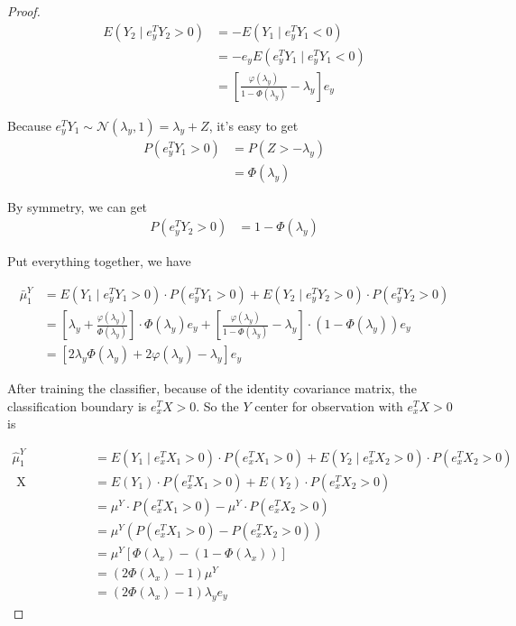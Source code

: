 \documentclass[11pt]{article}
\begin{document}
\begin{proof}
\begin{align}
E(Y_2 \mid e^T_y Y_2 > 0)  &= - E(Y_1 \mid e^T_y Y_1 < 0) \\
	&= - e_y E( e^T_y Y_1 \mid e^T_y Y_1 < 0  )  \\
	&= \left[ \frac{\varphi(\lambda_y)}{1-\Phi(\lambda_y)} - \lambda_y  \right] e_y 
\end{align}

Because $e^T_y Y_1 \sim \mathcal{N}\left( \lambda_y, 1\right)  = \lambda_y + Z$, it's easy to get 
\begin{align}
P(e^T_y Y_1 > 0) &= P(Z > - \lambda_y) \\
	&= \Phi(\lambda_y) 
\end{align}

By symmetry, we can get 
\begin{align}
P(e^T_y Y_2 > 0) &= 1- \Phi(\lambda_y)
\end{align}

Put everything together, we have 

\begin{align}
\bar{\mu}^Y_1 & = E(Y_1 \mid e^T_y Y_1 > 0) \cdot P(e^T_y Y_1 >0) +E(Y_2 \mid e^T_y Y_2 > 0) \cdot P(e^T_y Y_2 >0) \\
 &=  \left[ \lambda_y + \frac{\varphi(\lambda_y)}{\Phi(\lambda_y)}  \right]\cdot \Phi(\lambda_y) e_y + \left[ \frac{\varphi(\lambda_y)}{1-\Phi(\lambda_y)} - \lambda_y  \right]\cdot\left(1- \Phi(\lambda_y)\right) e_y  \\
 & = [2\lambda_y \Phi(\lambda_y) + 2\varphi(\lambda_y) - \lambda_y]e_y 
\end{align}

After training the classifier, because of the identity covariance matrix, the classification boundary is $e^T_x X > 0$. So the $Y$ center for observation with $e^T_x X > 0$ is 

\begin{align}
\hat{\mu}^Y_1 &= E(Y_1 \mid e^T_x X_1 > 0)\cdot P(e^T_x X_1 > 0) + E(Y_2 \mid e^T_x X_2 > 0)\cdot P(e^T_x X_2 > 0)\\ 
\text{ X independent of Y}	&= E(Y_1) \cdot P(e^T_x X_1 > 0) + E(Y_2) \cdot P(e^T_x X_2 > 0)\\ 
  & = \mu^Y \cdot P(e^T_x X_1 > 0) -  \mu^Y \cdot P(e^T_x X_2 > 0)\\
  & = \mu^Y \left( P(e^T_x X_1 > 0) -  P(e^T_x X_2 > 0)  \right) \\
   & = \mu^Y \left[ \Phi(\lambda_x) -  (1-\Phi(\lambda_x))  \right] \\
   & = (2\Phi(\lambda_x) - 1)\mu^Y \\
    & = (2\Phi(\lambda_x) - 1)\lambda_y e_y
\end{align}


\end{proof}
\end{document}
